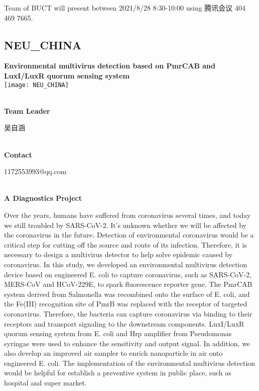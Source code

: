 \vfill{}









Team of BUCT will present between    2021/8/28 8:30-10:00     using 腾讯会议 404 469 7665.
\newpage


\subsection{\textcolor{Blu}{ NEU\_CHINA } }
\vspace{5mm}
\begin{center}
\large{
  \textbf{ Environmental multivirus detection based on PmrCAB and LuxI/LuxR quorum sensing system }\\
  \texttt{[image: NEU\_CHINA]}
}
\end{center}
\textbf{\\Team Leader}

  吴自涵


\textbf{\\Contact}

  1172553993@qq.com


\textbf{\\A Diagnostics Project\\}\begin{spacing}{1.5}

Over the years, humans have suffered from coronavirus several times, and today we still troubled by SARS-CoV-2. It’s unknown whether we will be affected by the coronavirus in the future. Detection of environmental coronavirus would be a critical step for cutting off the source and route of its infection. Therefore, it is necessary to design a multivirus detector to help solve epidemic caused by coronavirus. In this study, we developed an environmental multivirus detection device based on engineered E. coli to capture coronavirus, such as SARS-CoV-2, MERS-CoV and HCoV-229E, to spark fluorescence reporter gene. The PmrCAB system derived from Salmonella was recombined onto the surface of E. coli, and the Fe(III) recognition site of PmrB was replaced with the receptor of targeted coronavirus. Therefore, the bacteria can capture coronavirus via binding to their receptors and transport signaling to the downstream components. LuxI/LuxR quorum sensing system from E. coli and Hrp amplifier from Pseudomonas syringae were used to enhance the sensitivity and output signal. In addition, we also develop an improved air sampler to enrich nanoparticle in air onto engineered E. coli. The implementation of the environmental multivirus detection would be helpful for establish a preventive system in public place, such as hospital and super market.\end{spacing}
\\

